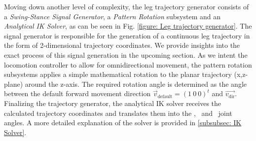 Moving down another level of complexity, the leg trajectory generator consists of a \textit{Swing-Stance Signal Generator}, a \textit{Pattern Rotation} subsystem and an \textit{Analytical IK Solver}, as can be seen in Fig. \ref{figure: Leg trajectory generator}.
The signal generator is responsible for the generation of a continuous leg trajectory in the form of 2-dimensional trajectory coordinates.
We provide insights into the exact process of this signal generation in the upcoming section.
As we intent the locomotion controller to allow for omnidirectional movement, the pattern rotation subsystems applies a simple mathematical rotation to the planar trajectory (x,z-plane) around the z-axis.
The required rotation angle is determined as the angle between the default forward movement direction $\vec{v}_\text{default} = (1 \ 0 \ 0)^t$ and $\vec{v_\text{dir}}$.
Finalizing the trajectory generator, the analytical IK solver receives the calculated trajectory coordinates and translates them into the \textalpha, \textbeta \ and \textgamma \ joint angles.
A more detailed explanation of the solver is provided in \ref{subsubsec: IK Solver}.


